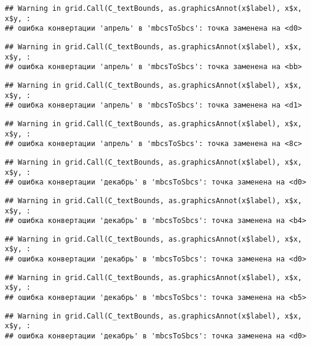 \documentclass[
]{article}
\begin{document}
\begin{verbatim}
## Warning in grid.Call(C_textBounds, as.graphicsAnnot(x$label), x$x, x$y, :
## ошибка конвертации 'апрель' в 'mbcsToSbcs': точка заменена на <d0>
\end{verbatim}

\begin{verbatim}
## Warning in grid.Call(C_textBounds, as.graphicsAnnot(x$label), x$x, x$y, :
## ошибка конвертации 'апрель' в 'mbcsToSbcs': точка заменена на <bb>
\end{verbatim}

\begin{verbatim}
## Warning in grid.Call(C_textBounds, as.graphicsAnnot(x$label), x$x, x$y, :
## ошибка конвертации 'апрель' в 'mbcsToSbcs': точка заменена на <d1>
\end{verbatim}

\begin{verbatim}
## Warning in grid.Call(C_textBounds, as.graphicsAnnot(x$label), x$x, x$y, :
## ошибка конвертации 'апрель' в 'mbcsToSbcs': точка заменена на <8c>
\end{verbatim}

\begin{verbatim}
## Warning in grid.Call(C_textBounds, as.graphicsAnnot(x$label), x$x, x$y, :
## ошибка конвертации 'декабрь' в 'mbcsToSbcs': точка заменена на <d0>
\end{verbatim}

\begin{verbatim}
## Warning in grid.Call(C_textBounds, as.graphicsAnnot(x$label), x$x, x$y, :
## ошибка конвертации 'декабрь' в 'mbcsToSbcs': точка заменена на <b4>
\end{verbatim}

\begin{verbatim}
## Warning in grid.Call(C_textBounds, as.graphicsAnnot(x$label), x$x, x$y, :
## ошибка конвертации 'декабрь' в 'mbcsToSbcs': точка заменена на <d0>
\end{verbatim}

\begin{verbatim}
## Warning in grid.Call(C_textBounds, as.graphicsAnnot(x$label), x$x, x$y, :
## ошибка конвертации 'декабрь' в 'mbcsToSbcs': точка заменена на <b5>
\end{verbatim}

\begin{verbatim}
## Warning in grid.Call(C_textBounds, as.graphicsAnnot(x$label), x$x, x$y, :
## ошибка конвертации 'декабрь' в 'mbcsToSbcs': точка заменена на <d0>
\end{verbatim}
\end{document}
